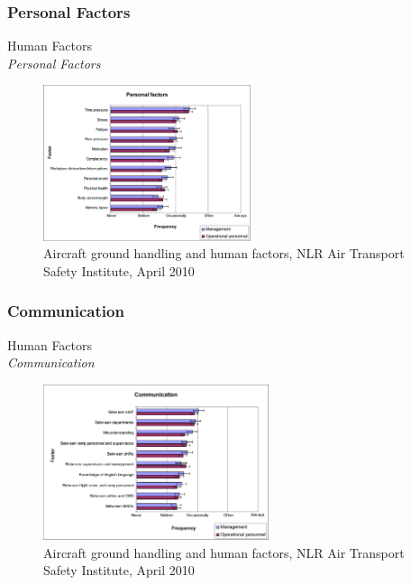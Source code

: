 \subsubsection{Personal Factors}
\begin{frame}{Human Factors\\\textit{Personal Factors}}{}
	\begin{figure}[H]
	\centering
	\includegraphics[width=230px]{Grafik/PersonalFactors}
	\caption{\footnotesize Aircraft ground handling and human factors, NLR Air Transport Safety Institute, April 2010}
\end{figure}
\end{frame}

\subsubsection{Communication}
\begin{frame}{Human Factors\\\textit{Communication}}{}
	\begin{figure}[H]
	\centering
	\includegraphics[width=250px]{Grafik/CommunicationalFactors}
	\caption{\footnotesize Aircraft ground handling and human factors, NLR Air Transport Safety Institute, April 2010}
\end{figure}
\end{frame}


